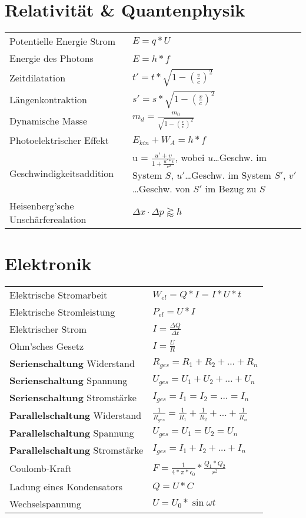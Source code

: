 \documentclass[12pt,a4paper]{paper}
\begin{document}
\section{Relativität \& Quantenphysik}
\begin{tabularx}{\textwidth}{X|X}
	Potentielle Energie Strom & $E=q*U$\\
Energie des Photons &  $E = h *f$\\
Zeitdilatation & $t' = t * \sqrt{1- (\frac{v}{c})^2}$\\
Längenkontraktion & $s' = s * \sqrt{1- (\frac{v}{c})^2}$\\
Dynamische Masse & $m_{d} = \frac{m_0}{\sqrt{1- (\frac{v}{c})^2}}$\\
Photoelektrischer Effekt & $E_{kin} + W_A=h*f$\\
Geschwindigkeitsaddition & u = $\frac{{u' + v}}{{1 + \frac{{u'  * v}}{{{c^2}}}}} $, wobei $u$\dots Geschw. im System $S$, $u'$\dots Geschw. im System $S'$, $v'$\dots Geschw. von $S'$ im Bezug zu $S$\\
Heisenberg'sche Unschärferealation & $\Delta x \cdot \Delta p \gtrapprox h $
\end{tabularx}
\section{Elektronik}
\begin{tabularx}{\textwidth}{X|X}
	Elektrische Stromarbeit & $ W_{el} = Q * I = I * U * t$\\
	Elektrische Stromleistung & $P_{el} = U * I$\\
	Elektrischer Strom & $I = \frac{\Delta Q}{\Delta t}$\\
	Ohm'sches Gesetz & $I=\frac{U}{R}$\\
	\textbf{Serienschaltung} Widerstand & $R_{ges} = R_1 + R_2 + \dots + R_n$\\
	\textbf{Serienschaltung} Spannung & $U_{ges} = U_1 + U_2 + \dots + U_n$\\
	\textbf{Serienschaltung} Stromstärke & $ I_{ges} = I_1 = I_2 = \dots  = I_n$\\

	\textbf{Parallelschaltung} Widerstand & $\frac{1}{R_{ges}} = \frac{1}{R_{1}} + \frac{1}{R_{2}} + \dots + \frac{1}{R_{n}}$\\
	\textbf{Parallelschaltung} Spannung & $U_{ges} = U_{1} = U_{2} = U_{n}$\\
	\textbf{Parallelschaltung} Stromstärke  & $I_{ges}=I_{1}+I_{2}+\dots+I_{n}$\\
	Coulomb-Kraft & $F = \frac{1}{4*\pi * \epsilon_{0}} * \frac{Q_1 * Q_2}{r^2}$\\
	Ladung eines Kondensators & $Q = U * C$\\
	Wechselspannung & $U = U_0 * \sin{\omega t}$\\
\end{tabularx}
\end{document}
